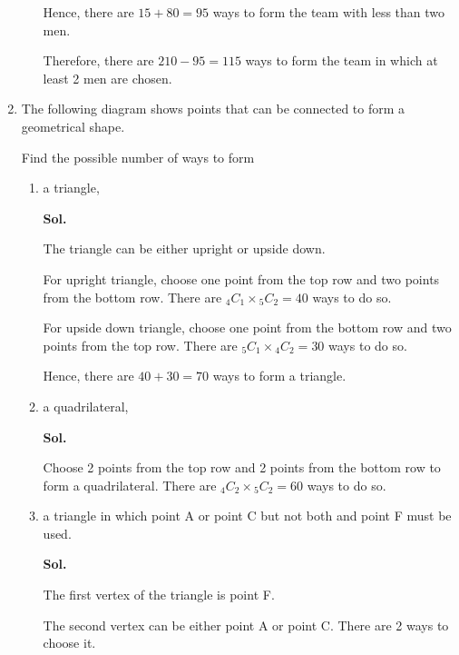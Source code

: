 \documentclass{report}
\newcommand\comb[2][^n]{{}_{#1}C_{#2}}
\newcommand{\sol}[1]{

      \noindent \textbf{Sol.}
}
\def\eos{\quad\hbox{\rlap{\hbox{\vrule depth 1.5pt height 2.6mm width 0.2mm \hskip 1mm \vrule height 2.6mm width 0.2mm}}{\vbox{\hrule height 0.2mm width 1.4mm \vskip 2.8mm \hrule depth 1.5pt height -0.35mm width 1.2mm}}}}
\begin{document}
\begin{multicols*}{2}
\begin{enumerate}
\begin{enumerate}
                              Hence, there are $15 + 80 = 95$ ways to form the team with less than two men.

                              Therefore, there are $210 - 95 = 115$ ways to form the team in which at least 2
                              men are chosen. $\eos$
                  \end{enumerate}

            \item The following diagram shows points that can be connected to form a geometrical
                  shape.

                  Find the possible number of ways to form
                  \begin{enumerate}
                        \item a triangle, \sol{}

                              The triangle can be either upright or upside down.

                              For upright triangle, choose one point from the top row and two points from the
                              bottom row. There are $\comb[4]{1} \times \comb[5]{2} = 40$ ways to do so.

                              For upside down triangle, choose one point from the bottom row and two points
                              from the top row. There are $\comb[5]{1} \times \comb[4]{2} = 30$ ways to do
                              so.

                              Hence, there are $40 + 30 = 70$ ways to form a triangle. $\eos$

                        \item a quadrilateral, \sol{}

                              Choose 2 points from the top row and 2 points from the bottom row to form a
                              quadrilateral. There are $\comb[4]{2} \times \comb[5]{2} = 60$ ways to do so.
                              $\eos$

                        \item a triangle in which point A or point C but not both and point F must be used.
                              \sol{}

                              The first vertex of the triangle is point F.

                              The second vertex can be either point A or point C. There are 2 ways to choose
                              it.


\end{enumerate}
\end{enumerate}
\end{multicols*}
\end{document}
